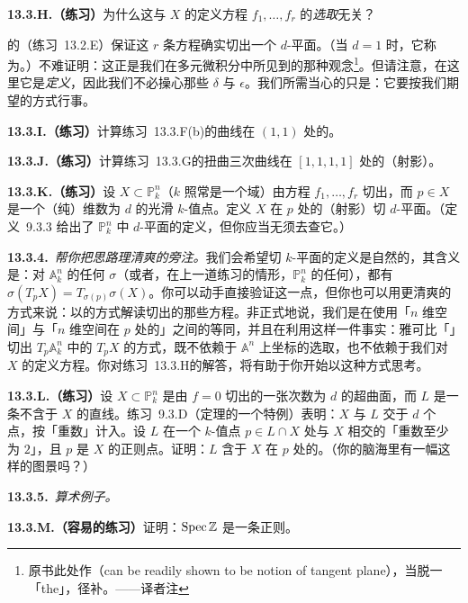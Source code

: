 \textbf{13.3.H.（练习）}\quad 为什么这与 $X$ 的定义方程 $f_1,\dots,f_r$ 的\emph{选取}无关？

\trRegularity{}的\trJacobianCriterion（\mbox{练习~13.2.E}）保证这 $r$ 条方程确实切出一个 $d$-平面。（当 $d=1$ 时，它称为\trTangentLine。）不难证明：这正是我们在多元微积分中所见到的那种\trTangentPlane{}观念\footnote{原书此处作（can be readily shown to be notion of tangent plane），当脱一「the」，径补。——译者注}。但请注意，在这里它是\emph{定义}，因此我们不必操心那些 $\delta$ 与 $\epsilon$。我们所需当心的只是：它要按我们期望的方式行事。

\textbf{13.3.I.（练习）}\quad 计算\mbox{练习~13.3.F(b)}的曲线在 $(1,1)$ 处的\trTangentLine。

\textbf{13.3.J.（练习）}\quad 计算\mbox{练习~13.3.G}的扭曲三次曲线在 $[1,1,1,1]$ 处的（射影）\trTangentLine。

\textbf{13.3.K.（练习）}\quad 设 $X\subset\mathbb{P}^n_k$（$k$ 照常是一个域）由\trHomogeneous{}方程 $f_1,\dots,f_r$ 切出，而 $p\in X$ 是一个（纯）维数为 $d$ 的光滑 $k$-值点。定义 $X$ 在 $p$ 处的（射影）切 $d$-平面。（定义~9.3.3 给出了 $\mathbb{P}^n_k$ 中 $d$-平面的定义，但你应当无须去查它。）

\textbf{13.3.4.}\ \emph{帮你把思路理清爽的旁注。}\quad 我们会希望切 $k$-平面的定义是自然的，其含义是：对 $\mathbb{A}^n_k$ 的任何\trAutomorphism{} $\sigma$（或者，在上一道练习的情形，$\mathbb{P}^n_k$ 的任何\trAutomorphism），都有 $\sigma(T_pX)=T_{\sigma(p)}\sigma(X)$。你可以动手直接验证这一点，但你也可以用更清爽的方式来说：以\trCoordinateFree{}的方式解读切出\trTangentSpace{}的那些方程。非正式地说，我们是在使用「$n$ 维空间」与「$n$ 维空间在 $p$ 处的\trTangentSpace」之间的\trCanonical{}等同，并且在利用这样一件事实：雅可比「\trLinearTransformation」切出 $T_p\mathbb{A}^n_k$ 中的 $T_pX$ 的方式，既不依赖于 $\mathbb{A}^n$ 上坐标的选取，也不依赖于我们对 $X$ 的定义方程。你对\mbox{练习~13.3.H}的解答，将有助于你开始以这种方式思考。

\textbf{13.3.L.（练习）}\quad 设 $X\subset\mathbb{P}^n_k$ 是由 $f=0$ 切出的一张次数为 $d$ 的超曲面，而 $L$ 是一条不含于 $X$ 的直线。\mbox{练习~9.3.D}（\trBezout{}定理的一个特例）表明：$X$ 与 $L$ 交于 $d$ 个点，按「重数」计入。设 $L$ 在一个 $k$-值点 $p\in L\cap X$ 处与 $X$ 相交的「重数至少为 $2$」，且 $p$ 是 $X$ 的正则点。证明：$L$ 含于 $X$ 在 $p$ 处的\trTangentPlane。（你的脑海里有一幅这样的图景吗？）

\textbf{13.3.5.}\ \emph{算术例子。}

\textbf{13.3.M.（容易的练习）}\quad 证明：$\operatorname{Spec}\mathbb{Z}$ 是一条正则\trCurve。

